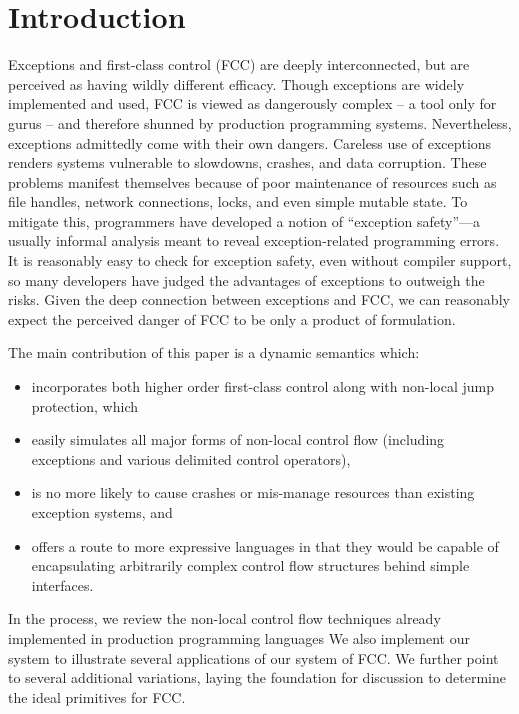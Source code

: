 \documentclass[11pt]{article}
\newcommand{\maybePage}{\newpage}
\begin{document}
\maybePage
\section{Introduction}

Exceptions and first-class control (FCC) are deeply interconnected, but are perceived as having wildly different efficacy.
Though exceptions are widely implemented and used, FCC is viewed as dangerously complex -- a tool only for gurus -- and therefore shunned by production programming systems.
Nevertheless, exceptions admittedly come with their own dangers.
Careless use of exceptions renders systems vulnerable to slowdowns, crashes, and data corruption.
These problems manifest themselves because of poor maintenance of resources such as file handles, network connections, locks, and even simple mutable state.
To mitigate this, programmers have developed a notion of ``exception safety''---a usually informal analysis meant to reveal exception-related programming errors.
It is reasonably easy to check for exception safety, even without compiler support, so many developers have judged the advantages of exceptions to outweigh the risks.
Given the deep connection between exceptions and FCC, we can reasonably expect the perceived danger of FCC to be only a product of formulation.

The main contribution of this paper is a dynamic semantics which:
\begin{itemize}
\item incorporates both higher order first-class control along with non-local jump protection, which
\item easily simulates all major forms of non-local control flow (including exceptions and various delimited control operators),
\item is no more likely to cause crashes or mis-manage resources than existing exception systems, and
\item offers a route to more expressive languages in that they would be capable of encapsulating arbitrarily complex control flow structures behind simple interfaces.
\end{itemize}
In the process, we review the non-local control flow techniques already implemented in production programming languages
We also implement our system to illustrate several applications of our system of FCC.
We further point to several additional variations, laying the foundation for discussion to determine the ideal primitives for FCC.
\end{document}
